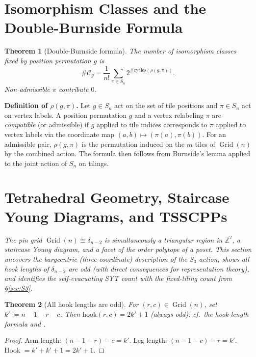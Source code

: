 \documentclass[12pt,reqno]{amsart}
\theoremstyle{plain}
\newtheorem{theorem}{Theorem}[section]
\theoremstyle{definition}
\theoremstyle{remark}
\DeclareMathOperator{\Grid}{Grid}
\begin{document}
\section{Isomorphism Classes and the Double-Burnside Formula}
\label{sec:classes}

\begin{theorem}[Double-Burnside formula]\label{thm:double_burnside}
The number of isomorphism classes fixed by position permutation $g$ is
\[
  \#\mathcal{C}_g = \frac{1}{n!}\sum_{\pi\in S_n}
    2^{\#\mathrm{cycles}(\rho(g,\pi))}.
\]
Non-admissible $\pi$ contribute $0$.
\end{theorem}
\noindent\textbf{Definition of $\rho(g,\pi)$.}
Let $g \in S_n$ act on the set of tile positions and $\pi \in S_n$ act on
vertex labels. A position permutation $g$ and a vertex relabeling $\pi$ are
\emph{compatible} (or admissible) if $g$ applied to tile indices corresponds to
$\pi$ applied to vertex labels via the coordinate map $(a,b)\mapsto(\pi(a),\pi(b))$.
For an admissible pair, $\rho(g,\pi)$ is the permutation induced on the $m$
tiles of $\Grid(n)$ by the combined action. The formula then follows from
Burnside's lemma applied to the joint action of $S_n$ on tilings.\medskip

\section{Tetrahedral Geometry, Staircase Young Diagrams, and TSSCPPs}
\label{sec:tetra}

\noindent\textit{The pin grid $\Grid(n) \cong \delta_{n-2}$ is simultaneously a triangular region in $\mathbb{Z}^2$, a staircase Young diagram, and a facet of the order polytope of a poset. This section uncovers the barycentric (three-coordinate) description of the $S_3$ action, shows all hook lengths of $\delta_{n-2}$ are odd (with direct consequences for representation theory), and identifies the self-evacuating SYT count with the fixed-tiling count from \S\ref{sec:S3}.}

\begin{theorem}[All hook lengths are odd]\label{thm:hooks_odd}
For $(r,c)\in\Grid(n)$, set $k':=n-1-r-c$. Then
$\mathrm{hook}(r,c) = 2k'+1$ (always odd); cf.\ the hook-length formula
\cite{FRT54} and \cite[Ch.~7]{stanley}.
\end{theorem}
\begin{proof}
Arm length: $(n-1-r)-c = k'$. Leg length: $(n-1-c)-r = k'$.
Hook $= k'+k'+1 = 2k'+1$.
\end{proof}
\end{document}
